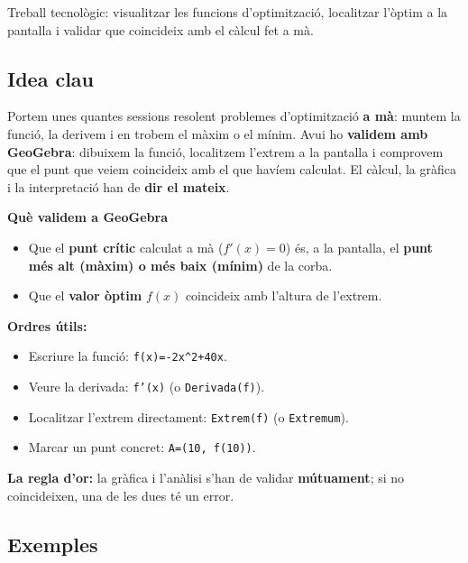 %
{Treball tecnològic: visualitzar les funcions d'optimització, localitzar l'òptim a la pantalla i validar que coincideix amb el càlcul fet a mà.}

\subsection{Idea clau}

Portem unes quantes sessions resolent problemes d'optimització \textbf{a mà}: muntem la
funció, la derivem i en trobem el màxim o el mínim. Avui ho \textbf{validem amb
GeoGebra}: dibuixem la funció, localitzem l'extrem a la pantalla i comprovem que el
punt que veiem coincideix amb el que havíem calculat. El càlcul, la gràfica i la
interpretació han de \textbf{dir el mateix}.

\begin{idea}
\textbf{Què validem a GeoGebra}
\begin{itemize}[leftmargin=1.4em, itemsep=2pt]
  \item Que el \textbf{punt crític} calculat a mà ($f'(x)=0$) és, a la pantalla, el
        \textbf{punt més alt (màxim) o més baix (mínim)} de la corba.
  \item Que el \textbf{valor òptim} $f(x)$ coincideix amb l'altura de l'extrem.
\end{itemize}
\textbf{Ordres útils:}
\begin{itemize}[leftmargin=1.4em, itemsep=2pt]
  \item Escriure la funció: \texttt{f(x)=-2x\^{}2+40x}.
  \item Veure la derivada: \texttt{f'(x)} (o \texttt{Derivada(f)}).
  \item Localitzar l'extrem directament: \texttt{Extrem(f)} (o \texttt{Extremum}).
  \item Marcar un punt concret: \texttt{A=(10, f(10))}.
\end{itemize}
\textbf{La regla d'or:} la gràfica i l'anàlisi s'han de validar \textbf{mútuament}; si
no coincideixen, una de les dues té un error.
\end{idea}

\subsection{Exemples}

